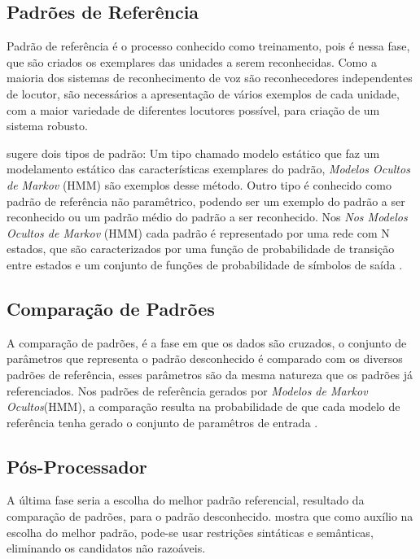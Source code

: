 \subsection{Padrões de Referência}
Padrão de referência é o processo conhecido como treinamento, pois é nessa fase, que são criados os exemplares das unidades a serem reconhecidas. Como a maioria dos sistemas de reconhecimento de voz são reconhecedores independentes de locutor, são necessários a apresentação de vários exemplos de cada unidade, com a maior variedade de diferentes locutores possível, para criação de um sistema robusto.

 sugere dois tipos de padrão: Um tipo chamado modelo estático que faz um modelamento estático das características exemplares do padrão, \textit{Modelos Ocultos de Markov} (HMM) são exemplos desse método. Outro tipo é conhecido como padrão de referência não paramêtrico, podendo ser um exemplo do padrão a ser reconhecido ou um padrão médio do padrão a ser reconhecido.
Nos \textit{Nos Modelos Ocultos de Markov} (HMM) cada padrão é representado por uma rede com N estados, que são caracterizados por uma função de probabilidade de transição entre estados e um conjunto de funções de probabilidade de símbolos de saída \cite{AvaliaTecJose}.


\subsection{Comparação de Padrões}

A comparação de padrões, é a fase em que os dados são cruzados, o conjunto de parâmetros que representa o padrão desconhecido é comparado com os diversos padrões de referência, esses parâmetros são da mesma natureza que os padrões já referenciados.
Nos padrões de referência gerados por \textit{Modelos de Markov Ocultos}(HMM), a comparação resulta na probabilidade de que cada modelo de referência tenha gerado o conjunto de paramêtros de entrada \cite{AvaliaTecJose}.


\subsection{Pós-Processador}

A última fase seria a escolha do melhor padrão referencial, resultado da comparação de padrões, para o padrão desconhecido.  mostra que como auxílio na escolha do melhor padrão, pode-se usar restrições sintáticas e semânticas, eliminando os candidatos não razoáveis. 

